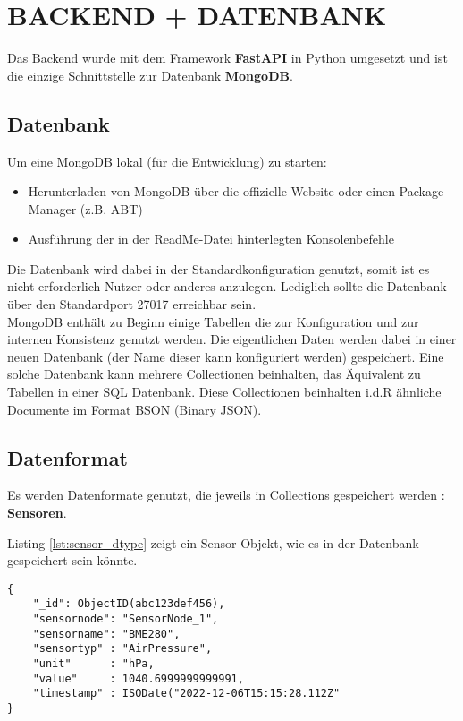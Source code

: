 \section{BACKEND + DATENBANK}\label{ch:backend}

Das Backend wurde mit dem Framework \textbf{FastAPI} in Python umgesetzt und ist die einzige Schnittstelle zur Datenbank \textbf{MongoDB}.

\subsection{Datenbank}
Um eine MongoDB lokal (für die Entwicklung) zu starten:
\begin{itemize}
\item Herunterladen von MongoDB über die offizielle Website oder einen Package Manager (z.B. ABT)
\item Ausführung der in der ReadMe-Datei hinterlegten Konsolenbefehle
\end{itemize}
Die Datenbank wird dabei in der Standardkonfiguration genutzt, somit ist es nicht erforderlich Nutzer oder anderes anzulegen.
Lediglich sollte die Datenbank über den Standardport 27017 erreichbar sein. \\

MongoDB enthält zu Beginn einige Tabellen die zur Konfiguration und zur internen Konsistenz genutzt werden.
Die eigentlichen Daten werden dabei in einer neuen Datenbank (der Name dieser kann konfiguriert werden) gespeichert.
Eine solche Datenbank kann mehrere Collectionen beinhalten, das Äquivalent zu Tabellen in einer SQL Datenbank.
Diese Collectionen beinhalten i.d.R ähnliche Documente im Format BSON (Binary JSON). 

\subsection{Datenformat}
Es werden Datenformate genutzt, die jeweils in Collections gespeichert werden : \textbf{Sensoren}.

Listing \ref{lst:sensor_dtype} zeigt ein Sensor Objekt, wie es in der Datenbank gespeichert sein könnte.
\begin{lstlisting}[caption={Sensor Objekt},captionpos=b,showstringspaces=false, basicstyle=\small,label={lst:sensor_dtype}]
{
    "_id": ObjectID(abc123def456),
    "sensornode": "SensorNode_1",
    "sensorname": "BME280",
    "sensortyp" : "AirPressure",
    "unit"      : "hPa,
    "value"     : 1040.6999999999991,
    "timestamp" : ISODate("2022-12-06T15:15:28.112Z"
}
\end{lstlisting}

